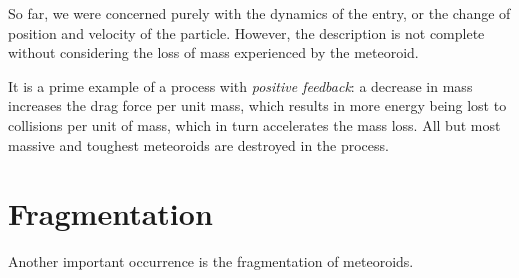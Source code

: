 
So far, we were concerned purely with the dynamics of the entry, or the change of position and velocity of the particle.
However, the description is not complete without considering the loss of mass experienced by the meteoroid.

It is a prime example of a process with \emph{positive feedback}: a decrease in mass
increases the drag force per unit mass, which results in more energy being lost to collisions
per unit of mass, which in turn accelerates the mass loss.
All but most massive and toughest meteoroids are destroyed in the process.

\section{Fragmentation} \label{af}
    Another important occurrence is the fragmentation of meteoroids.
